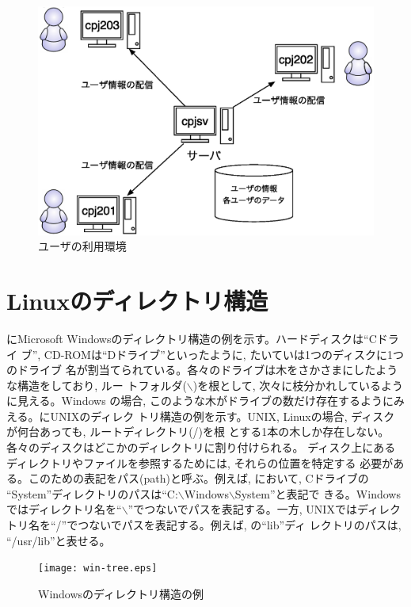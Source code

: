 \begin{figure}[htbp]
\begin{center}
\includegraphics[width=0.8\linewidth]{cpj.eps}
\caption{ユーザの利用環境}
\label{fig:cpj}
\end{center}
\end{figure}

\section{Linuxのディレクトリ構造}
にMicrosoft Windowsのディレクトリ構造の例を示す。ハードディスクは``Cドライ
ブ'', CD-ROMは``Dドライブ''といったように, たいていは1つのディスクに1つのドライブ
名が割当てられている。各々のドライブは木をさかさまにしたような構造をしており, ルー
トフォルダ($\backslash$)を根として, 次々に枝分かれしているように見える。Windows
の場合, このような木がドライブの数だけ存在するようにみえる。にUNIXのディレク
トリ構造の例を示す。UNIX, Linuxの場合, ディスクが何台あっても, ルートディレクトリ(/)を根
とする1本の木しか存在しない。各々のディスクはどこかのディレクトリに割り付けられる。
ディスク上にあるディレクトリやファイルを参照するためには, それらの位置を特定する
必要がある。このための表記をパス(path)と呼ぶ。例えば, において, Cドライブの
``System''ディレクトリのパスは``C:$\backslash$Windows$\backslash$System''と表記で
きる。Windows ではディレクトリ名を``$\backslash$''でつないでパスを表記する。一方,
UNIXではディレクトリ名を``/''でつないでパスを表記する。例えば, の``lib''ディ
レクトリのパスは, ``/usr/lib''と表せる。

\begin{figure}[htbp]
\begin{center}
\texttt{[image: win-tree.eps]}
\caption{Windowsのディレクトリ構造の例}
\label{fig:win-tree}
\end{center}
\end{figure}

